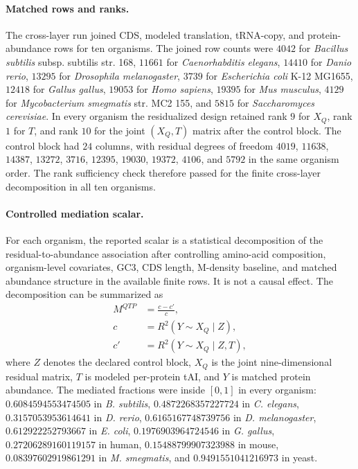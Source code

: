 \paragraph{Matched rows and ranks.}
The cross-layer run joined CDS, modeled translation, tRNA-copy, and protein-abundance rows for ten organisms. The joined row counts were $4042$ for \emph{Bacillus subtilis} subsp. subtilis str. 168, $11661$ for \emph{Caenorhabditis elegans}, $14410$ for \emph{Danio rerio}, $13295$ for \emph{Drosophila melanogaster}, $3739$ for \emph{Escherichia coli} K-12 MG1655, $12418$ for \emph{Gallus gallus}, $19053$ for \emph{Homo sapiens}, $19395$ for \emph{Mus musculus}, $4129$ for \emph{Mycobacterium smegmatis} str. MC2 155, and $5815$ for \emph{Saccharomyces cerevisiae}. In every organism the residualized design retained rank $9$ for $X_Q$, rank $1$ for $T$, and rank $10$ for the joint $(X_Q,T)$ matrix after the control block. The control block had $24$ columns, with residual degrees of freedom $4019$, $11638$, $14387$, $13272$, $3716$, $12395$, $19030$, $19372$, $4106$, and $5792$ in the same organism order. The rank sufficiency check therefore passed for the finite cross-layer decomposition in all ten organisms.

\paragraph{Controlled mediation scalar.}
For each organism, the reported scalar is a statistical decomposition of the residual-to-abundance association after controlling amino-acid composition, organism-level covariates, GC3, CDS length, M-density baseline, and matched abundance structure in the available finite rows. It is not a causal effect. The decomposition can be summarized as
$$
\begin{aligned}
M^{QTP} &= \frac{c-c'}{c},\\
c &= R^{2}(Y \sim X_Q \mid Z),\\
c' &= R^{2}(Y \sim X_Q \mid Z,T),
\end{aligned}
$$
where $Z$ denotes the declared control block, $X_Q$ is the joint nine-dimensional residual matrix, $T$ is modeled per-protein tAI, and $Y$ is matched protein abundance. The mediated fractions were inside $[0,1]$ in every organism: $0.6084594553474505$ in \emph{B. subtilis}, $0.4872268357227724$ in \emph{C. elegans}, $0.3157053953614641$ in \emph{D. rerio}, $0.6165167748739756$ in \emph{D. melanogaster}, $0.612922252793667$ in \emph{E. coli}, $0.1976903964724546$ in \emph{G. gallus}, $0.27206289160119157$ in human, $0.15488799907323988$ in mouse, $0.08397602919861291$ in \emph{M. smegmatis}, and $0.9491551041216973$ in yeast.

